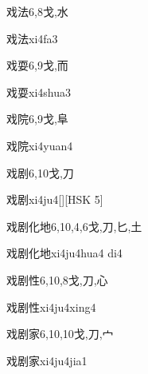 \begin{Entry}{戏法}{6,8}{⼽,⽔}
  \begin{Phonetics}{戏法}{xi4fa3}
  \end{Phonetics}
\end{Entry}

\begin{Entry}{戏耍}{6,9}{⼽,⽽}
  \begin{Phonetics}{戏耍}{xi4shua3}
  \end{Phonetics}
\end{Entry}

\begin{Entry}{戏院}{6,9}{⼽,⾩}
  \begin{Phonetics}{戏院}{xi4yuan4}
  \end{Phonetics}
\end{Entry}

\begin{Entry}{戏剧}{6,10}{⼽,⼑}
  \begin{Phonetics}{戏剧}{xi4ju4}[][HSK 5]
  \end{Phonetics}
\end{Entry}

\begin{Entry}{戏剧化地}{6,10,4,6}{⼽,⼑,⼔,⼟}
  \begin{Phonetics}{戏剧化地}{xi4ju4hua4 di4}
  \end{Phonetics}
\end{Entry}

\begin{Entry}{戏剧性}{6,10,8}{⼽,⼑,⼼}
  \begin{Phonetics}{戏剧性}{xi4ju4xing4}
  \end{Phonetics}
\end{Entry}

\begin{Entry}{戏剧家}{6,10,10}{⼽,⼑,⼧}
  \begin{Phonetics}{戏剧家}{xi4ju4jia1}
  \end{Phonetics}
\end{Entry}


